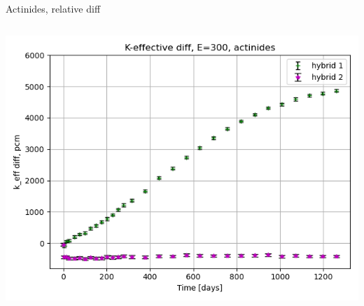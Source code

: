 \documentclass[
	11pt, %
	aspectratio=169, %
]{beamer}
\begin{document}
\begin{frame}{Actinides, relative diff}
	\begin{columns}[c] %
		\begin{column}{0.39\textwidth}
			\includegraphics[width=\textwidth]{../figures/keff/keff_actinides_300_diff.png}


\end{column}
\end{columns}
\end{frame}
\end{document}
